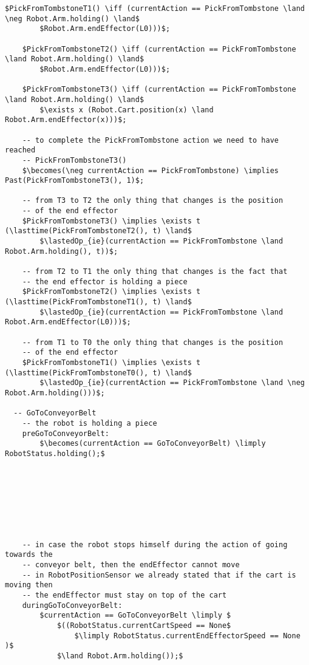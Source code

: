 \begin{lstlisting}[fontadjust, mathescape, frame=single]
    $PickFromTombstoneT1() \iff (currentAction == PickFromTombstone \land \neg Robot.Arm.holding() \land$
        $Robot.Arm.endEffector(L0)))$;
    
    $PickFromTombstoneT2() \iff (currentAction == PickFromTombstone \land Robot.Arm.holding() \land$
        $Robot.Arm.endEffector(L0)))$;
    
    $PickFromTombstoneT3() \iff (currentAction == PickFromTombstone \land Robot.Arm.holding() \land$
        $\exists x (Robot.Cart.position(x) \land Robot.Arm.endEffector(x)))$;
    
    -- to complete the PickFromTombstone action we need to have reached
    -- PickFromTombstoneT3()
    $\becomes(\neg currentAction == PickFromTombstone) \implies Past(PickFromTombstoneT3(), 1)$;
    
    -- from T3 to T2 the only thing that changes is the position
    -- of the end effector
    $PickFromTombstoneT3() \implies \exists t (\lasttime(PickFromTombstoneT2(), t) \land$
        $\lastedOp_{ie}(currentAction == PickFromTombstone \land Robot.Arm.holding(), t))$;

    -- from T2 to T1 the only thing that changes is the fact that
    -- the end effector is holding a piece
    $PickFromTombstoneT2() \implies \exists t (\lasttime(PickFromTombstoneT1(), t) \land$
        $\lastedOp_{ie}(currentAction == PickFromTombstone \land Robot.Arm.endEffector(L0)))$;
    
    -- from T1 to T0 the only thing that changes is the position
    -- of the end effector
    $PickFromTombstoneT1() \implies \exists t (\lasttime(PickFromTombstoneT0(), t) \land$
        $\lastedOp_{ie}(currentAction == PickFromTombstone \land \neg Robot.Arm.holding()))$;

  -- GoToConveyorBelt
    -- the robot is holding a piece
    preGoToConveyorBelt:
        $\becomes(currentAction == GoToConveyorBelt) \limply RobotStatus.holding();$
    







    -- in case the robot stops himself during the action of going towards the 
    -- conveyor belt, then the endEffector cannot move 
    -- in RobotPositionSensor we already stated that if the cart is moving then 
    -- the endEffector must stay on top of the cart
    duringGoToConveyorBelt:
        $currentAction == GoToConveyorBelt \limply $
            $((RobotStatus.currentCartSpeed == None$ 
                $\limply RobotStatus.currentEndEffectorSpeed == None )$
            $\land Robot.Arm.holding());$


\end{lstlisting}

